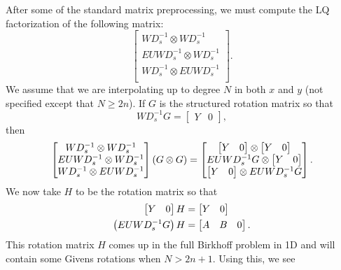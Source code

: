 After some of the standard matrix preprocessing, we must compute
the LQ factorization of the following matrix:
%
\begin{equation}
    \begin{bmatrix}
        WD_{s}^{-1} \otimes WD_{s}^{-1} \\
        EUWD_{s}^{-1} \otimes WD_{s}^{-1} \\
        WD_{s}^{-1} \otimes EUWD_{s}^{-1} \\
    \end{bmatrix}.
\end{equation}
%
We assume that we are interpolating up to degree $N$ in both $x$
and $y$ (not specified except that $N\ge2n$).
If $G$ is the structured rotation matrix so that
%
\begin{equation}
    WD_{s}^{-1}G = \begin{bmatrix} Y & 0 \end{bmatrix},
\end{equation}
%
then
%
\begin{equation}
    \begin{bmatrix}
        WD_{s}^{-1} \otimes WD_{s}^{-1} \\
        EUWD_{s}^{-1} \otimes WD_{s}^{-1} \\
        WD_{s}^{-1} \otimes EUWD_{s}^{-1} \\
    \end{bmatrix}
    \left( G\otimes G \right) = 
    \begin{bmatrix}
        \begin{bmatrix} Y & 0 \end{bmatrix} \otimes
            \begin{bmatrix} Y & 0 \end{bmatrix} \\
        EUWD_{s}^{-1}G \otimes \begin{bmatrix} Y & 0 \end{bmatrix} \\
        \begin{bmatrix} Y & 0 \end{bmatrix} \otimes EUWD_{s}^{-1}G \\
    \end{bmatrix}.
\end{equation}
%
We now take $H$ to be the rotation matrix so that
%
\begin{align}
    \begin{bmatrix} Y & 0 \end{bmatrix}H &= \begin{bmatrix} Y & 0 \end{bmatrix}
        \nonumber\\
    \left( EUWD_{s}^{-1}G \right)H &= \begin{bmatrix} A & B & 0 \end{bmatrix}.
\end{align}
%
This rotation matrix $H$ comes up in the full Birkhoff problem in 1D
and will contain some Givens rotations when $N>2n+1$.
Using this, we see

